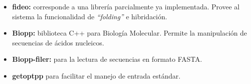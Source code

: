 \documentclass[12pt,a4paper]{article}
\begin{document}
\begin{itemize}
    \item \textbf{fideo:} corresponde a una librería parcialmente ya implementada. Provee al sistema la
     funcionalidad de \emph{``folding''} e hibridación. 

    \item \textbf{Biopp:} biblioteca C++ para Biología Molecular. Permite la manipulación de secuencias de
    ácidos nucleicos.  

    \item \textbf{Biopp-filer:} para la lectura de secuencias en formato FASTA.    

    \item \textbf{getoptpp} para facilitar el manejo de entrada estándar.
\end{itemize}
\end{document}
